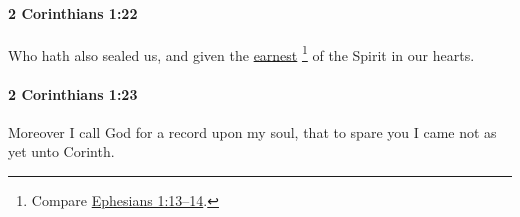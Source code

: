 		\paragraph{2 Corinthians 1:22} %
			\label{2CORINTHIANS-1-22}

			Who hath also sealed us, and given the \hyperref[EARNEST]{earnest}%
				\footnote{%
					Compare \hyperref[EPHESIANS-1-13]{Ephesians 1:13--14}.
					}
			of the Spirit in our hearts.

			\begin{framed}
			\scriptsize
				\begin{compactdesc}
					\item[SBLG]  \hyperref[SPHRAGIZO]{}  \hyperref[ARRABON]{} 
				\end{compactdesc}
			\end{framed}

		\paragraph{2 Corinthians 1:23} %
			\label{2CORINTHIANS-1-23}

			Moreover I call God for a record upon my soul, that to spare you I came not as yet unto Corinth.

